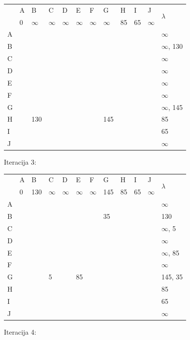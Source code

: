\documentclass[12pt]{article}
\begin{document}
\begin{table}[hp]
\centering
\begin{tabular}{|l|l|l|l|l|l|l|l|l|l|l|l|}
\hline
\multirow{2}{*}{} & A & B & C & D & E & F & G & H & I & J & \multirow{2}{*}{$\lambda$} \\ \cline{2-11}
 & 0 & $\infty$ & $\infty$ & $\infty$ & $\infty$ & $\infty$ & $\infty$ & 85 & 65 & $\infty$ &  \\ \hline
A &  &  &  &  &  &  &  &  &  &  & $\infty$ \\ \hline
B &  &  &  &  &  &  &  &  &  &  & $\infty$, 130 \\ \hline
C &  &  &  &  &  &  &  &  &  &  & $\infty$ \\ \hline
D &  &  &  &  &  &  &  &  &  &  & $\infty$ \\ \hline
E &  &  &  &  &  &  &  &  &  &  & $\infty$ \\ \hline
F &  &  &  &  &  &  &  &  &  &  & $\infty$ \\ \hline
G &  &  &  &  &  &  &  &  &  &  & $\infty$, 145 \\ \hline
H &  & 130 &  &  &  &  & 145 &  &  &  & 85 \\ \hline
I &  &  &  &  &  &  &  &  &  &  & 65 \\ \hline
J &  &  &  &  &  &  &  &  &  &  & $\infty$ \\ \hline
\end{tabular}
\end{table}

Iteracija 3:

\begin{table}[hp]
\centering
\begin{tabular}{|l|l|l|l|l|l|l|l|l|l|l|l|}
\hline
\multirow{2}{*}{} & A & B & C & D & E & F & G & H & I & J & \multirow{2}{*}{$\lambda$} \\ \cline{2-11}
 & 0 & 130 & $\infty$ & $\infty$ & $\infty$ & $\infty$ & 145 & 85 & 65 & $\infty$ &  \\ \hline
A &  &  &  &  &  &  &  &  &  &  & $\infty$ \\ \hline
B &  &  &  &  &  &  & 35 &  &  &  & 130 \\ \hline
C &  &  &  &  &  &  &  &  &  &  & $\infty$, 5 \\ \hline
D &  &  &  &  &  &  &  &  &  &  & $\infty$ \\ \hline
E &  &  &  &  &  &  &  &  &  &  & $\infty$, 85 \\ \hline
F &  &  &  &  &  &  &  &  &  &  & $\infty$ \\ \hline
G &  &  & 5 &  & 85 &  &  &  &  &  & 145, 35 \\ \hline
H &  &  &  &  &  &  &  &  &  &  & 85 \\ \hline
I &  &  &  &  &  &  &  &  &  &  & 65 \\ \hline
J &  &  &  &  &  &  &  &  &  &  & $\infty$ \\ \hline
\end{tabular}
\end{table}
\newpage
Iteracija 4:
\end{document}
